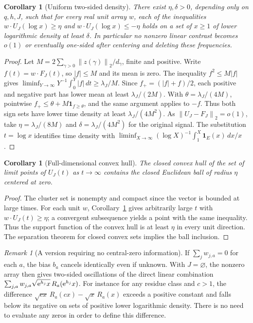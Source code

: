 \documentclass[11pt]{article}
\newtheorem{corollary}[theorem]{Corollary}
\theoremstyle{remark}\newtheorem{remark}[theorem]{Remark}
\newcommand{\norm}[1]{\left\lVert #1\right\rVert}\newcommand{\abs}[1]{\left|#1\right|}
\begin{document}
\begin{corollary}[Uniform two-sided density]\label{cor:density}
There exist $\eta,\delta>0$, depending only on $q,h,J$, such that for every real unit array $w$, each of the inequalities $w\cdot U_J(\log x)\ge\eta$ and $w\cdot U_J(\log x)\le-\eta$ holds on a set of $x\ge1$ of lower logarithmic density at least $\delta$. In particular no nonzero linear contrast becomes $o(1)$ or eventually one-sided after centering and deleting these frequencies.
\end{corollary}
\begin{proof}
Let $M=2\sum_{\gamma>0}\norm{z(\gamma)}_2/d_\gamma$, finite and positive. Write $f(t)=w\cdot F_J(t)$, so $|f|\le M$ and its mean is zero. The inequality $f^2\le M|f|$ gives $\liminf_{Y\to\infty}Y^{-1}\int_0^Y |f|\,dt\ge\lambda_J/M$. Since $f_+=(|f|+f)/2$, each positive and negative part has lower mean at least $\lambda_J/(2M)$. With $\theta=\lambda_J/(4M)$, pointwise $f_+\le\theta+M\mathbf1_{f\ge\theta}$, and the same argument applies to $-f$. Thus both sign sets have lower time density at least $\lambda_J/(4M^2)$. As $\norm{U_J-F_J}_2=o(1)$, take $\eta=\lambda_J/(8M)$ and $\delta=\lambda_J/(4M^2)$ for the original signal. The substitution $t=\log x$ identifies time density with $\liminf_{X\to\infty}(\log X)^{-1}\int_1^X\mathbf1_E(x)\,dx/x$.
\end{proof}

\begin{corollary}[Full-dimensional convex hull]\label{cor:hull}
The closed convex hull of the set of limit points of $U_J(t)$ as $t\to\infty$ contains the closed Euclidean ball of radius $\eta$ centered at zero.
\end{corollary}
\begin{proof}
The cluster set is nonempty and compact since the vector is bounded at large times. For each unit $w$, Corollary~\ref{cor:density} gives arbitrarily large $t$ with $w\cdot U_J(t)\ge\eta$; a convergent subsequence yields a point with the same inequality. Thus the support function of the convex hull is at least $\eta$ in every unit direction. The separation theorem for closed convex sets implies the ball inclusion.
\end{proof}

\begin{remark}[A version requiring no central-zero information]
If $\sum_j w_{j,a}=0$ for each $a$, the bias $b_a$ cancels identically even if unknown. With $J=\varnothing$, the nonzero array then gives two-sided oscillations of the direct linear combination $\sum_{j,a} w_{j,a}\sqrt{\mathrm e^{h_j}x}\,R_a(\mathrm e^{h_j}x)$. For instance for any residue class and $c>1$, the difference $\sqrt{cx}\,R_a(cx)-\sqrt{x}\,R_a(x)$ exceeds a positive constant and falls below its negative on sets of positive lower logarithmic density. There is no need to evaluate any zeros in order to define this difference.
\end{remark}
\end{document}

